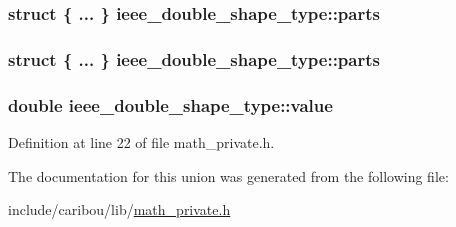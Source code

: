 \hypertarget{unionieee__double__shape__type_a56d56a067ef071ada93836397ea0050a}{
\subsubsection[{parts}]{\setlength{\rightskip}{0pt plus 5cm}struct \{ ... \}   ieee\-\_\-double\-\_\-shape\-\_\-type\-::parts}}\label{unionieee__double__shape__type_a56d56a067ef071ada93836397ea0050a}
\hypertarget{unionieee__double__shape__type_a14b6183c096c0f76d6596e3c737d3c9b}{
\subsubsection[{parts}]{\setlength{\rightskip}{0pt plus 5cm}struct \{ ... \}   ieee\-\_\-double\-\_\-shape\-\_\-type\-::parts}}\label{unionieee__double__shape__type_a14b6183c096c0f76d6596e3c737d3c9b}
\hypertarget{unionieee__double__shape__type_a2d9c4cab9e3fa74e4be6d72f798a145b}{
\subsubsection[{value}]{\setlength{\rightskip}{0pt plus 5cm}double ieee\-\_\-double\-\_\-shape\-\_\-type\-::value}}\label{unionieee__double__shape__type_a2d9c4cab9e3fa74e4be6d72f798a145b}


Definition at line 22 of file math\-\_\-private.\-h.



The documentation for this union was generated from the following file\-:\begin{DoxyCompactItemize}
\item 
include/caribou/lib/\hyperlink{math__private_8h}{math\-\_\-private.\-h}\end{DoxyCompactItemize}
